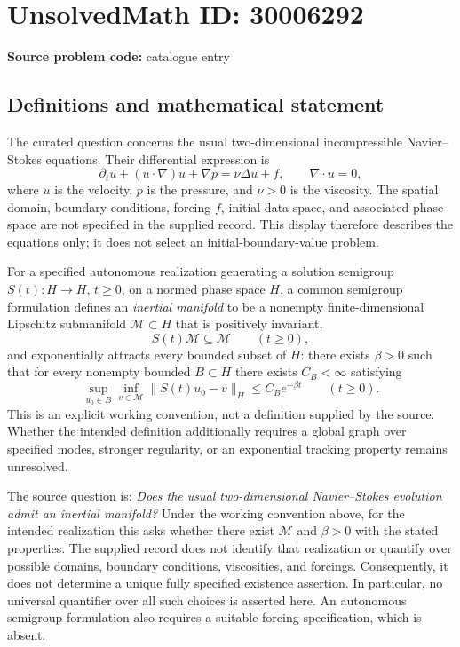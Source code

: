 \documentclass[11pt]{article}
\begin{document}
\section*{UnsolvedMath ID: 30006292}
\textbf{Source problem code:} catalogue entry
\subsection{Definitions and mathematical statement}
The curated question concerns the usual two-dimensional incompressible Navier--Stokes equations. Their differential expression is
\[
\partial_t u+(u\cdot\nabla)u+\nabla p=\nu\Delta u+f,
\qquad \nabla\cdot u=0,
\]
where \(u\) is the velocity, \(p\) is the pressure, and \(\nu>0\) is the viscosity. The spatial domain, boundary conditions, forcing \(f\), initial-data space, and associated phase space are not specified in the supplied record. This display therefore describes the equations only; it does not select an initial-boundary-value problem.

For a specified autonomous realization generating a solution semigroup \(S(t):H\to H\), \(t\geq0\), on a normed phase space \(H\), a common semigroup formulation defines an \emph{inertial manifold} to be a nonempty finite-dimensional Lipschitz submanifold \(\mathcal M\subset H\) that is positively invariant,
\[
S(t)\mathcal M\subseteq\mathcal M\qquad(t\geq0),
\]
and exponentially attracts every bounded subset of \(H\): there exists \(\beta>0\) such that for every nonempty bounded \(B\subset H\) there exists \(C_B<\infty\) satisfying
\[
\sup_{u_0\in B}\inf_{v\in\mathcal M}
\|S(t)u_0-v\|_H\leq C_B e^{-\beta t}
\qquad(t\geq0).
\]
This is an explicit working convention, not a definition supplied by the source. Whether the intended definition additionally requires a global graph over specified modes, stronger regularity, or an exponential tracking property remains unresolved.

The source question is: \emph{Does the usual two-dimensional Navier--Stokes evolution admit an inertial manifold?} Under the working convention above, for the intended realization this asks whether there exist \(\mathcal M\) and \(\beta>0\) with the stated properties. The supplied record does not identify that realization or quantify over possible domains, boundary conditions, viscosities, and forcings. Consequently, it does not determine a unique fully specified existence assertion. In particular, no universal quantifier over all such choices is asserted here. An autonomous semigroup formulation also requires a suitable forcing specification, which is absent.
\end{document}
